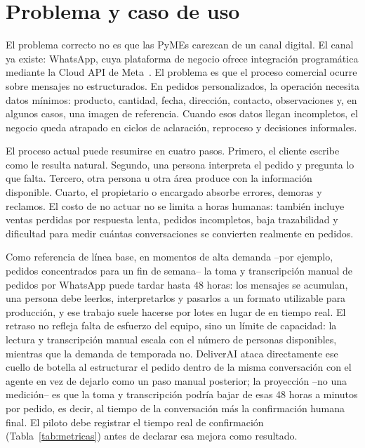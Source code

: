 \section{Problema y caso de uso}

El problema correcto no es que las PyMEs carezcan de un canal digital. El canal ya existe: WhatsApp, cuya plataforma de negocio ofrece integración programática mediante la Cloud API de Meta~\cite{meta2026whatsapp}. El problema es que el proceso comercial ocurre sobre mensajes no estructurados. En pedidos personalizados, la operación necesita datos mínimos: producto, cantidad, fecha, dirección, contacto, observaciones y, en algunos casos, una imagen de referencia. Cuando esos datos llegan incompletos, el negocio queda atrapado en ciclos de aclaración, reproceso y decisiones informales.

El proceso actual puede resumirse en cuatro pasos. Primero, el cliente escribe como le resulta natural. Segundo, una persona interpreta el pedido y pregunta lo que falta. Tercero, otra persona u otra área produce con la información disponible. Cuarto, el propietario o encargado absorbe errores, demoras y reclamos. El costo de no actuar no se limita a horas humanas: también incluye ventas perdidas por respuesta lenta, pedidos incompletos, baja trazabilidad y dificultad para medir cuántas conversaciones se convierten realmente en pedidos.

Como referencia de línea base, en momentos de alta demanda --por ejemplo, pedidos concentrados para un fin de semana-- la toma y transcripción manual de pedidos por WhatsApp puede tardar hasta 48 horas: los mensajes se acumulan, una persona debe leerlos, interpretarlos y pasarlos a un formato utilizable para producción, y ese trabajo suele hacerse por lotes en lugar de en tiempo real. El retraso no refleja falta de esfuerzo del equipo, sino un límite de capacidad: la lectura y transcripción manual escala con el número de personas disponibles, mientras que la demanda de temporada no. DeliverAI ataca directamente ese cuello de botella al estructurar el pedido dentro de la misma conversación con el agente en vez de dejarlo como un paso manual posterior; la proyección --no una medición-- es que la toma y transcripción podría bajar de esas 48 horas a minutos por pedido, es decir, al tiempo de la conversación más la confirmación humana final. El piloto debe registrar el tiempo real de confirmación (Tabla~\ref{tab:metricas}) antes de declarar esa mejora como resultado.

